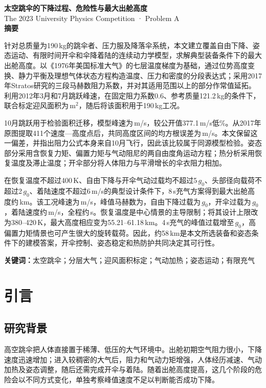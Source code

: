 \documentclass[11pt,a4paper]{article}
\renewenvironment{abstract}{}{}
\newcommand{\keywords}[1]{\noindent\textbf{关键词：}#1}
\begin{document}
\thispagestyle{empty}
\begin{center}
{\Large\bfseries 太空跳伞的下降过程、危险性与最大出舱高度}\\[10pt]
{\normalsize The 2023 University Physics Competition · Problem A}\\[16pt]
{\large\bfseries 摘要}
\end{center}

\begin{abstract}
针对总质量为190\,kg的跳伞者、压力服及降落伞系统，本文建立覆盖自由下降、姿态运动、有限时间开伞和伞降着陆的连续动力学模型，求解典型装备条件下的最大出舱高度。以《1976年美国标准大气》的七层温度梯度为基础，通过位势高度变换、静力平衡及理想气体状态方程构造温度、压力和密度的分段表达式；采用2017年Stratos研究的三段马赫数阻力系数，并对其适用范围以上的部分作常值延拓。利用2012年3月和7月跳跃峰速，在固定阻力系数0.6、参考质量121.2\,kg的条件下，联合标定迎风面积为\FitArea\,m$^2$，随后将该面积用于190\,kg工况。

10月跳跃用于检验面积迁移，模型峰速为\OctV\,m/s，较公开值377.1\,m/s低\OctError\%。从2017年原图提取411个速度—高度点后，共同高度区间的均方根误差为\CurveRMSE\,m/s。本文保留这一偏差，并指出阻力公式本身来自10月飞行，因此该比较属于同源模型检验。姿态部分采用含恢复力矩、偏置力矩与气动阻尼的两自由度角运动方程；热分析采用恢复温度及滞止温度；开伞部分将人体阻力与平滑增长的伞衣阻力相加。

在恢复温度不超过400\,K、自由下降与开伞气动过载均不超过5\,$g_0$、头部径向载荷不超过2\,$g_0$、着陆速度不超过6\,m/s的典型设计条件下，8\,s充气方案得到最大出舱高度约\MaxHeight\,km。该工况峰速为\PeakV\,m/s，峰值马赫数为\PeakMach，自由下降过载为\FreeG\,$g_0$，开伞过载为\OpenG\,$g_0$，着陆速度约\LandingV\,m/s，全程约\TotalTime\,s。恢复温度是中心情景的主导限制；将其设计上限改为380--420\,K，最大高度相应变为55.21--61.18\,km。4\,s充气的峰值过载增至\FastOpenG\,$g_0$，高偏置力矩情景也可产生很大的旋转载荷。因此，约58\,km是本文所选装备和姿态条件下的建模答案，开伞控制、姿态稳定和热防护共同决定其可行性。

\end{abstract}
\medskip
\keywords{太空跳伞；分层大气；迎风面积标定；气动加热；姿态运动；有限充气}
\newpage
{\small\tableofcontents}
\newpage

\section{引言}
\subsection{研究背景}
高空跳伞把人体直接置于稀薄、低压的大气环境中。出舱初期空气阻力很小，下降速度迅速增加；进入较稠密的大气后，阻力和气动力矩增强，人体经历减速、气动加热及姿态调整，随后还需完成开伞与着陆。随着出舱高度提高，这几个阶段的危险会以不同方式变化，单独考察峰值速度不足以判断能否成功下降。
\end{document}

